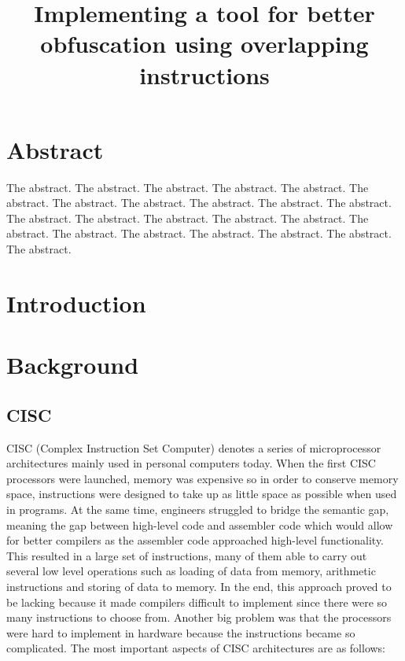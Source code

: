 \documentclass[11pt,twoside]{eitExjobb}
\title{Implementing a tool for better obfuscation using overlapping instructions}
\begin{document}
\Date{\today}
\MakeTitlePage
\frontmatter
\chapter*{Abstract}
The abstract. The abstract. The abstract. The abstract. The
abstract. The abstract. The abstract. The abstract. The abstract. The
abstract. The abstract. The abstract. The abstract. The abstract. The
abstract. The abstract. The abstract. The abstract. The abstract. The
abstract. The abstract. The abstract. The abstract.

\tableofcontents
\cleardoublepage
\mainmatter

\chapter{Introduction}

\chapter{Background}
\section{CISC}
CISC (Complex Instruction Set Computer) denotes a series of microprocessor architectures mainly used in personal computers today. When the first CISC processors were launched, memory was expensive so in order to conserve memory space, instructions were designed to take up as little space as possible when used in programs. At the same time, engineers struggled to bridge the semantic gap, meaning the gap between high-level code and assembler code which would allow for better compilers as the assembler code approached high-level functionality. This resulted in a large set of instructions, many of them able to carry out several low level operations such as loading of data from memory, arithmetic instructions and storing of data to memory. In the end, this approach proved to be lacking because it made compilers difficult to implement since there were so many instructions to choose from. Another big problem was that the processors were hard to implement in hardware because the instructions became so complicated. The most important aspects of CISC architectures are as follows:\cite{datorteknik}
\end{document}
